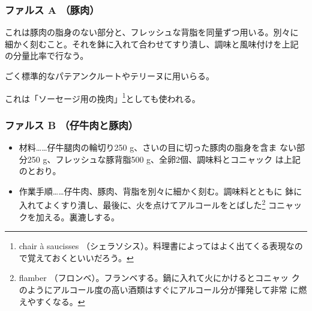 \begin{recette}
{\subsubsection{ファルス A （豚肉）}\label{farce-froide-a}}



これは豚肉の脂身のない部分と、フレッシュな背脂を同量ずつ用いる。別々に
細かく刻むこと。それを鉢に入れて合わせてすり潰し、調味と風味付けを上記
の分量比率で行なう。

ごく標準的なパテアンクルートやテリーヌに用いらる。

これは「\protect\hypertarget{chair-a-saucisse}{ソーセージ用の挽肉}」\footnote{chair
  à saucisses
  （シェラソシス）。料理書によってはよく出てくる表現なので覚えておくといいだろう。}としても使われる。\label{chair-a-saucisse}

\hypertarget{farce-froide-b}{%
\subsubsection{ファルス B （仔牛肉と豚肉）}\label{farce-froide-b}}



\begin{itemize}
\item
  材料\ldots{}\ldots{}仔牛腿肉の輪切り250
  g、さいの目に切った豚肉の脂身を含ま ない部分250
  g、フレッシュな豚背脂500 g、全卵2個、調味料とコニャック
  は上記のとおり。
\item
  作業手順\ldots{}\ldots{}仔牛肉、豚肉、背脂を別々に細かく刻む。調味料とともに
  鉢に入れてよくすり潰し、最後に、火を点けてアルコールをとばした\footnote{flamber
    （フロンベ）。フランベする。鍋に入れて火にかけるとコニャッ
    クのようにアルコール度の高い酒類はすぐにアルコール分が揮発して非常
    に燃えやすくなる。} コニャックを加える。裏漉しする。
\end{itemize}


\end{recette}
